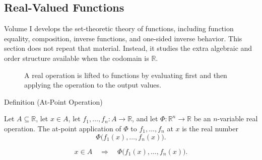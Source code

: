 
\subsection*{Real-Valued Functions}
\label{sec:real-valued-functions}

\begin{remark*}
Volume I develops the set-theoretic theory of functions, including function
equality, composition, inverse functions, and one-sided inverse behavior.  This
section does not repeat that material.  Instead, it studies the extra algebraic
and order structure available when the codomain is \(\mathbb{R}\).
\end{remark*}


\begin{figure}[htbp]
\centering

\caption{A real operation is lifted to functions by evaluating first and then applying the operation to the output values.}
\label{fig:pointwise-operation-lift}
\end{figure}

\begin{definitionbox}{Definition (At-Point Operation)}
\begin{definition}
\label{def:at-point-operation}
Let \(A\subseteq\mathbb{R}\), let \(x\in A\), let
\(f_1,\ldots,f_n:A\to\mathbb{R}\), and let
\(\Phi:\mathbb{R}^n\to\mathbb{R}\) be an \(n\)-variable real operation.
The at-point application of \(\Phi\) to \(f_1,\ldots,f_n\) at \(x\) is the
real number
\[
  \Phi\bigl(f_1(x),\ldots,f_n(x)\bigr).
\]
\end{definition}
\end{definitionbox}

\begin{remark*}
\[
  x\in A
  \quad\Longrightarrow\quad
  \Phi\bigl(f_1(x),\ldots,f_n(x)\bigr).
\]
\end{remark*}

